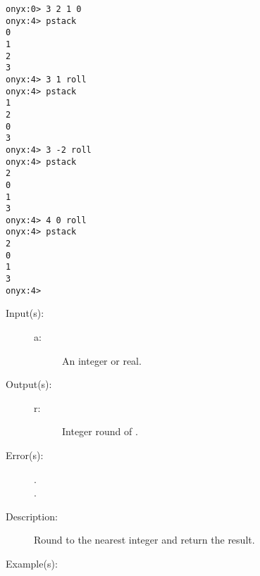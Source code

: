 \begin{description}
\begin{description}
\begin{verbatim}
onyx:0> 3 2 1 0
onyx:4> pstack
0
1
2
3
onyx:4> 3 1 roll
onyx:4> pstack
1
2
0
3
onyx:4> 3 -2 roll
onyx:4> pstack
2
0
1
3
onyx:4> 4 0 roll
onyx:4> pstack
2
0
1
3
onyx:4>
		\end{verbatim}
	\end{description}
\label{systemdict:round}
\item[{\onyxop{a}{round}{r}}: ]
	\begin{description}\item[]
	\item[Input(s): ]
		\begin{description}\item[]
		\item[a: ]
			An integer or real.
		\end{description}
	\item[Output(s): ]
		\begin{description}\item[]
		\item[r: ]
			Integer round of .
		\end{description}
	\item[Error(s): ]
		\begin{description}\item[]
		\item[.]
		\item[.]
		\end{description}
	\item[Description: ]
		Round  to the nearest integer and return the result.
	\item[Example(s): ]\begin{verbatim}


\end{verbatim}
\end{description}
\end{description}
